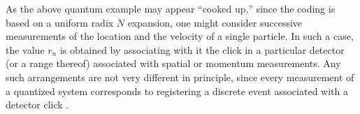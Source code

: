 As the above quantum example may appear ``cooked up,'' since  the
coding is based on a uniform radix $N$ expansion, one
might consider successive measurements of the location and the velocity of
a single particle. In such a case, the value $r_n$ is obtained by associating with it
the click in a particular detector (or a range thereof) associated with
spatial or momentum measurements. Any such arrangements are not very
different in principle, since every measurement of a quantized system
corresponds to registering a discrete event associated with a detector
click \cite{sum-3}.



%




